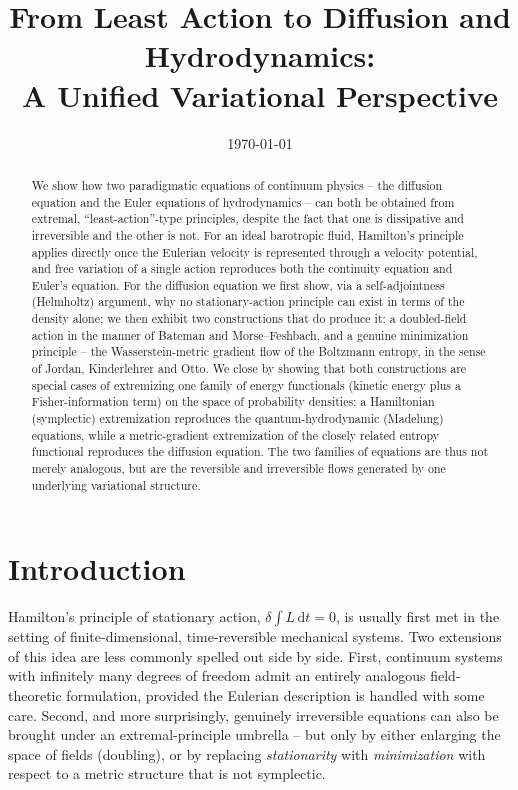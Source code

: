 \documentclass[11pt]{article}
\title{From Least Action to Diffusion and Hydrodynamics:\\
A Unified Variational Perspective}
\author{}
\date{\today}
\newcommand{\rd}{\mathrm{d}}
\begin{document}
\maketitle

\begin{abstract}
\noindent
We show how two paradigmatic equations of continuum physics -- the diffusion equation and the Euler equations of hydrodynamics -- can both be obtained from extremal, ``least-action''-type principles, despite the fact that one is dissipative and irreversible and the other is not. For an ideal barotropic fluid, Hamilton's principle applies directly once the Eulerian velocity is represented through a velocity potential, and free variation of a single action reproduces both the continuity equation and Euler's equation. For the diffusion equation we first show, via a self-adjointness (Helmholtz) argument, why no stationary-action principle can exist in terms of the density alone; we then exhibit two constructions that do produce it: a doubled-field action in the manner of Bateman and Morse--Feshbach, and a genuine minimization principle -- the Wasserstein-metric gradient flow of the Boltzmann entropy, in the sense of Jordan, Kinderlehrer and Otto. We close by showing that both constructions are special cases of extremizing one family of energy functionals (kinetic energy plus a Fisher-information term) on the space of probability densities: a Hamiltonian (symplectic) extremization reproduces the quantum-hydrodynamic (Madelung) equations, while a metric-gradient extremization of the closely related entropy functional reproduces the diffusion equation. The two families of equations are thus not merely analogous, but are the reversible and irreversible flows generated by one underlying variational structure.
\end{abstract}

\section{Introduction}

Hamilton's principle of stationary action, $\delta\int L\,\rd t = 0$, is usually first met in the setting of finite-dimensional, time-reversible mechanical systems. Two extensions of this idea are less commonly spelled out side by side. First, continuum systems with infinitely many degrees of freedom admit an entirely analogous field-theoretic formulation, provided the Eulerian description is handled with some care. Second, and more surprisingly, genuinely irreversible equations can also be brought under an extremal-principle umbrella -- but only by either enlarging the space of fields (doubling), or by replacing \emph{stationarity} with \emph{minimization} with respect to a metric structure that is not symplectic.
\end{document}
